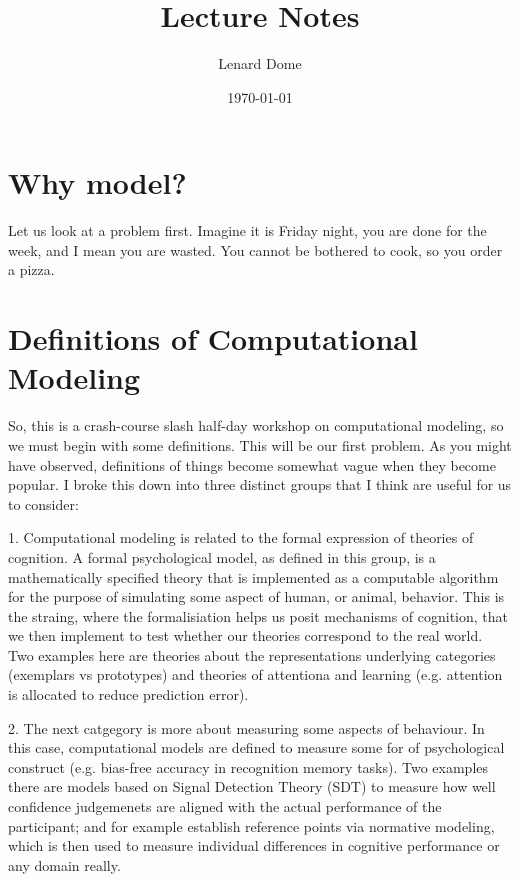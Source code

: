 \documentclass[12pt]{article}
\title{Lecture Notes}
\author{Lenard Dome}
\date{\today}
\begin{document}
\maketitle

\tableofcontents
\newpage

\section{Why model?}

Let us look at a problem first. Imagine it is Friday night, you are done for the week, and I mean you are wasted. You cannot be bothered to cook, so you order a pizza. 

\section{Definitions of Computational Modeling}

So, this is a crash-course slash half-day workshop on computational modeling, so we must begin with some definitions. This will be our first problem. As you might have observed, definitions of things become somewhat vague when they become popular. I broke this down into three distinct groups that I think are useful for us to consider:

1. Computational modeling is related to the formal expression of theories of cognition. A formal psychological model, as defined in this group, is a mathematically specified theory that is implemented as a computable algorithm for the purpose of simulating some aspect of human, or animal, behavior. This is the straing, where the formalisiation helps us posit mechanisms of cognition, that we then implement to test whether our theories correspond to the real world. Two examples here are theories about the representations underlying categories (exemplars vs prototypes) and theories of attentiona and learning (e.g. attention is allocated to reduce prediction error).

2. The next catgegory is more about measuring some aspects of behaviour. In this case, computational models are defined to measure some for of psychological construct (e.g. bias-free accuracy in recognition memory tasks). Two examples there are models based on Signal Detection Theory (SDT) to measure how well confidence judgemenets are aligned with the actual performance of the participant; and for example establish reference points via normative modeling, which is then used to measure individual differences in cognitive performance or any domain really.
\end{document}
